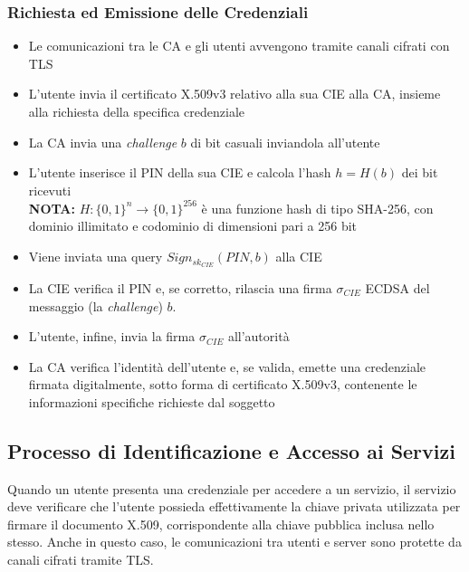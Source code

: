             \subsubsection{Richiesta ed Emissione delle Credenziali}
                \begin{itemize}
                    \item Le comunicazioni tra le CA e gli utenti avvengono tramite canali cifrati con TLS 

                    \item  L'utente invia il certificato X.509v3 relativo alla sua CIE alla CA, insieme alla richiesta della specifica credenziale

                    \item La CA invia una \textit{challenge} $b$ di bit casuali inviandola all'utente

                    \item L'utente inserisce il PIN della sua CIE e calcola l'hash $h = H(b)$ dei bit ricevuti \\
                    \textbf{NOTA:} $H : \{ {0, 1 \} }^n \rightarrow \{ {0, 1\} }^{256}$ è una funzione hash di tipo SHA-256, con dominio illimitato e codominio di dimensioni pari a 256 bit

                    \item Viene inviata una query $Sign_{sk_{CIE}}(PIN, b)$ alla CIE

                    \item La CIE verifica il PIN e, se corretto, rilascia una firma $\sigma_{CIE}$ ECDSA del messaggio (la \textit{challenge}) $b$.

                    \item L'utente, infine, invia la firma $\sigma_{CIE}$ all'autorità 
                    
                    \item La CA verifica l'identità dell'utente e, se valida, emette una credenziale firmata digitalmente, sotto forma di certificato X.509v3, contenente le informazioni specifiche richieste dal soggetto
                \end{itemize}
    
        \subsection{Processo di Identificazione e Accesso ai Servizi}
            Quando un utente presenta una credenziale per accedere a un servizio, il servizio deve verificare che l'utente possieda effettivamente la chiave privata utilizzata per firmare il documento X.509, corrispondente alla chiave pubblica inclusa nello stesso.
            Anche in questo caso, le comunicazioni tra utenti e server sono protette da canali cifrati tramite TLS.
    
